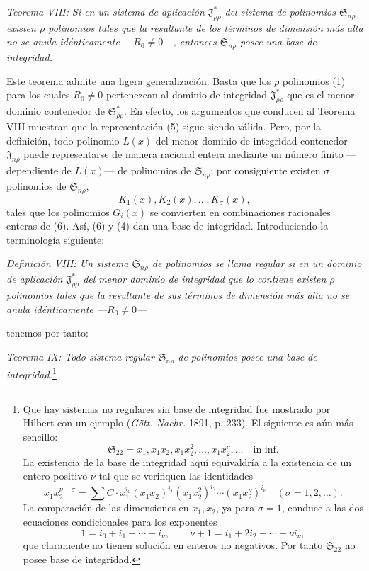 \documentclass[11pt]{article}
\providecommand{\Ssys}{\mathfrak{S}}
\providecommand{\Jdom}{\mathfrak{J}}
\begin{document}
\emph{Teorema VIII: Si en un sistema de aplicación $\Jdom^*_{\rho\rho}$ del sistema de polinomios $\Ssys_{n\rho}$ existen $\rho$ polinomios tales que la resultante de los términos de dimensión más alta no se anula idénticamente ---$R_0\ne0$---, entonces $\Ssys_{n\rho}$ posee una base de integridad.}

Este teorema admite una ligera generalización. Basta que los $\rho$ polinomios (1) para los cuales $R_0\ne0$ pertenezcan al dominio de integridad $\Jdom^*_{\rho\rho}$ que es el menor dominio contenedor de $\Ssys^*_{\rho\rho}$. En efecto, los argumentos que conducen al Teorema VIII muestran que la representación (5) sigue siendo válida. Pero, por la definición, todo polinomio $L(x)$ del menor dominio de integridad contenedor $\Jdom_{n\rho}$ puede representarse de manera racional entera mediante un número finito ---dependiente de $L(x)$--- de polinomios de $\Ssys_{n\rho}$; por consiguiente existen $\sigma$ polinomios de $\Ssys_{n\rho}$,
\begin{equation}
  K_1(x),K_2(x),\ldots,K_\sigma(x),
\tag{6}
\end{equation}
tales que los polinomios $G_i(x)$ se convierten en combinaciones racionales enteras de (6). Así, (6) y (4) dan una base de integridad. Introduciendo la terminología siguiente:

\emph{Definición VIII: Un sistema $\Ssys_{n\rho}$ de polinomios se llama regular si en un dominio de aplicación $\Jdom^*_{\rho\rho}$ del menor dominio de integridad que lo contiene existen $\rho$ polinomios tales que la resultante de sus términos de dimensión más alta no se anula idénticamente ---$R_0\ne0$---}

tenemos por tanto:

\emph{Teorema IX: Todo sistema regular $\Ssys_{n\rho}$ de polinomios posee una base de integridad.}\footnote{Que hay sistemas no regulares sin base de integridad fue mostrado por Hilbert con un ejemplo (\emph{Gött. Nachr.} 1891, p. 233). El siguiente es aún más sencillo:
\[
  \Ssys_{22}=x_1,
  x_1x_2,
  x_1x_2^2,
  \ldots,
  x_1x_2^\nu,
  \ldots\quad\text{in inf.}
\]
La existencia de la base de integridad aquí equivaldría a la existencia de un entero positivo $\nu$ tal que se verifiquen las identidades
\[
  x_1x_2^{\nu+\sigma}=\sum C\cdot x_1^{i_0}(x_1x_2)^{i_1}(x_1x_2^2)^{i_2}\cdots(x_1x_2^\nu)^{i_\nu}
  \quad(\sigma=1,2,\ldots).
\]
La comparación de las dimensiones en $x_1,x_2$, ya para $\sigma=1$, conduce a las dos ecuaciones condicionales para los exponentes
\[
  1=i_0+i_1+\cdots+i_\nu,
  \qquad
  \nu+1=i_1+2i_2+\cdots+\nu i_\nu,
\]
que claramente no tienen solución en enteros no negativos. Por tanto $\Ssys_{22}$ no posee base de integridad.}
\end{document}
